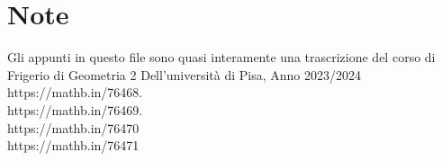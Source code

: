 \documentclass[a4paper,twoside]{article}
\theoremstyle{definition}
\numberwithin{theorem}{section}
\begin{document}
\section{Note}
Gli appunti in questo file sono quasi interamente una trascrizione del corso di Frigerio di Geometria 2 Dell'università di Pisa, Anno 2023/2024
https://mathb.in/76468. \\
https://mathb.in/76469. \\
https://mathb.in/76470 \\
https://mathb.in/76471 \\
\end{document}
